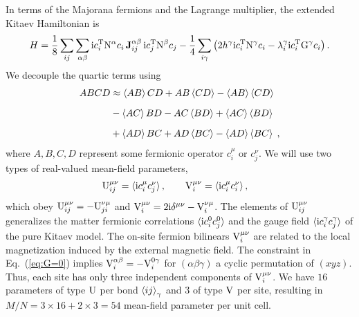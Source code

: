 In terms of the Majorana fermions and the Lagrange multiplier, the extended Kitaev Hamiltonian is
\begin{equation}
        H=\frac{1}{8}\sum_{ij } \sum_{\alpha\beta}
         \mathrm{i} c_i^{{\mathrm{T}}} \mathrm{N}^\alpha  c_i  \,  \mathbf{J}_{ij}^{\alpha\beta} \,  \mathrm{i} c_j^{{\mathrm{T}}} \mathrm{N}^\beta  c_j
         -  \frac{1}{4} \sum_{i\gamma} \left( 2 h^\gamma \mathrm{i} c_i^{{\mathrm{T}}} \mathrm{N}^\gamma  c_i - \lambda_i^\gamma \mathrm{i} c_i^{{\mathrm{T}}} \mathrm{G}^\gamma  c_i  \right)   .
          \label{eq:H}
\end{equation}
We decouple the quartic terms using
\begin{equation}
    \begin{split}
        ABCD &\approx \braket{ AB} CD + AB \braket{  CD} -  \braket{ AB}  \braket{ CD} \\[6pt]
         &- \braket{ AC } BD - AC \braket{BD}  +  \braket{AC} \braket{ BD}  \\[6pt]
         &+ \braket{ AD} BC + AD \braket{ BC} - \braket{ AD} \braket{ BC } \; ,
         \label{eq:3-MF-app}
    \end{split}
\end{equation}
where $A,B,C,D$ represent some fermionic operator  $c_i^\mu$ or $c_j^\nu$. We will use two types of real-valued  mean-field parameters,
\begin{align}
         \mathrm{U}_{ij}^{\mu\nu} = \braket{\mathrm{i} c_i^\mu c_j^\nu } , \qquad  \mathrm{V}_{i}^{\mu\nu} &= \braket{\mathrm{i} c_i^\mu c_i^\nu }      , \label{eq:MF_parameters}
\end{align}
which obey   $ \mathrm{U}_{ij}^{\mu\nu} =-  \mathrm{U}_{ji}^{\nu\mu}$ and $  \mathrm{V}_{i}^{\mu\nu}  = 2 \mathrm{i} \delta^{\mu\nu}- \mathrm{V}_{i}^{\nu\mu}$.
The elements of $\mathrm{U}_{ij}^{\mu\nu}$ generalizes the matter fermionic correlations $\braket{\mathrm{i} c^0_i c^0_j}$ and the gauge field $\braket{\mathrm{i} c^\gamma_i c^\gamma_j}$ of the pure Kitaev model. The on-site fermion bilinears $\mathrm{V}_i^{\mu\nu}$ are related to the local magnetization induced by the external magnetic field. The constraint in Eq.~(\ref{eq:G=0}) implies   $\mathrm{V}_{i}^{\alpha\beta}=-\mathrm{V}_{i}^{0\gamma}$ for $(\alpha\beta\gamma)$ a cyclic permutation of $(xyz)$. Thus, each site has only three independent components of $\mathrm{V}_i^{\mu\nu}$.
We have $16$ parameters of type $\mathrm{U}$ per bond $\braket{ij}_\gamma$ and $3$ of type $\mathrm{V}$ per site, resulting in $M/N=3\times 16+2\times 3 = 54$ mean-field parameter per unit cell.

